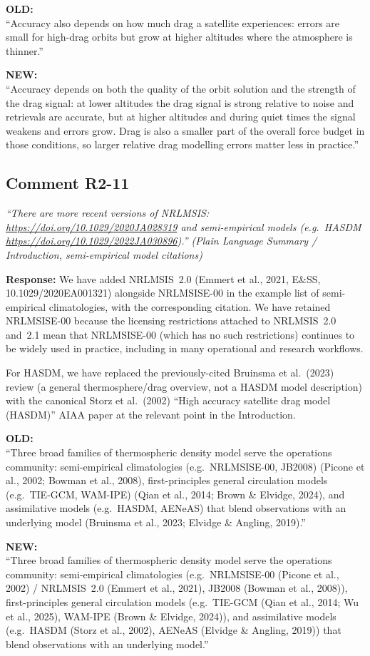 \documentclass[11pt]{article}
\newcommand{\reviewercomment}[1]{%
  \medskip
  \noindent\textit{\color{reviewblue}#1}%
  \medskip
}
\newcommand{\oldtext}[1]{%
  \smallskip
  \noindent\hspace{1em}\begin{minipage}{0.92\textwidth}%
  \color{quotegray}\textbf{OLD:}\\[2pt]``#1''%
  \end{minipage}%
  \smallskip
}
\newcommand{\newtext}[1]{%
  \smallskip
  \noindent\hspace{1em}\begin{minipage}{0.92\textwidth}%
  \color{quotegreen}\textbf{NEW:}\\[2pt]``#1''%
  \end{minipage}%
  \smallskip
}
\begin{document}
\oldtext{Accuracy also depends on how much drag a satellite experiences: errors are small for high-drag orbits but grow at higher altitudes where the atmosphere is thinner.}

\newtext{Accuracy depends on both the quality of the orbit solution and the strength of the drag signal: at lower altitudes the drag signal is strong relative to noise and retrievals are accurate, but at higher altitudes and during quiet times the signal weakens and errors grow. Drag is also a smaller part of the overall force budget in those conditions, so larger relative drag modelling errors matter less in practice.}


\subsection{Comment R2-11}

\reviewercomment{%
``There are more recent versions of NRLMSIS:
\url{https://doi.org/10.1029/2020JA028319} and semi-empirical models
(e.g.\ HASDM \url{https://doi.org/10.1029/2022JA030896}).''
(Plain Language Summary / Introduction, semi-empirical model
citations)}

\textbf{Response:}
We have added NRLMSIS~2.0 (Emmert et al., 2021, E\&SS,
10.1029/2020EA001321) alongside NRLMSISE-00 in the example list of
semi-empirical climatologies, with the corresponding citation. We
have retained NRLMSISE-00 because the licensing restrictions attached
to NRLMSIS~2.0 and~2.1 mean that NRLMSISE-00 (which has no such
restrictions) continues to be widely used in practice, including in
many operational and research workflows.

For HASDM, we have replaced the previously-cited Bruinsma et al.\ (2023)
review (a general thermosphere/drag overview, not a HASDM model
description) with the canonical Storz et al.\ (2002) ``High accuracy
satellite drag model (HASDM)'' AIAA paper at the relevant point in the
Introduction.

\oldtext{Three broad families of thermospheric density model serve the operations community: semi-empirical climatologies (e.g.\ NRLMSISE-00, JB2008) (Picone et al., 2002; Bowman et al., 2008), first-principles general circulation models (e.g.\ TIE-GCM, WAM-IPE) (Qian et al., 2014; Brown \& Elvidge, 2024), and assimilative models (e.g.\ HASDM, AENeAS) that blend observations with an underlying model (Bruinsma et al., 2023; Elvidge \& Angling, 2019).}

\newtext{Three broad families of thermospheric density model serve the operations community: semi-empirical climatologies (e.g.\ NRLMSISE-00 (Picone et al., 2002) / NRLMSIS~2.0 (Emmert et al., 2021), JB2008 (Bowman et al., 2008)), first-principles general circulation models (e.g.\ TIE-GCM (Qian et al., 2014; Wu et al., 2025), WAM-IPE (Brown \& Elvidge, 2024)), and assimilative models (e.g.\ HASDM (Storz et al., 2002), AENeAS (Elvidge \& Angling, 2019)) that blend observations with an underlying model.}
\end{document}
